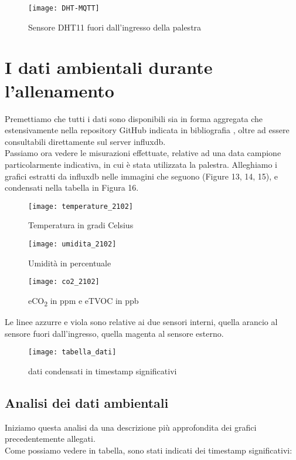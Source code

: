 \documentclass[fleqn,10pt]{SelfArx} %
\begin{document}
\begin{figure}[htb!]\centering
	\texttt{[image: DHT-MQTT]}
	\caption{Sensore DHT11 fuori dall'ingresso della palestra}
	\label{fig:DHT11 MQTT}
\end{figure}

\section{I dati ambientali durante l'allenamento}

Premettiamo che tutti i dati sono disponibili sia in forma aggregata che estensivamente nella repository GitHub indicata 
in bibliografia \cite{GitHub2}, oltre ad essere consultabili direttamente sul server influxdb.\\

Passiamo ora vedere le misurazioni effettuate, relative ad una data campione particolarmente indicativa, in cui è stata utilizzata 
la palestra. Alleghiamo i grafici estratti da influxdb nelle immagini che seguono (Figure 13, 14, 15), e 
condensati nella tabella in Figura 16.\\

\begin{figure}[htb]\centering
	\texttt{[image: temperature\_2102]}
	\caption{Temperatura in gradi Celsius}
	\label{fig:Variazione temperatura}
\end{figure}
\begin{figure}[htb]\centering
	\texttt{[image: umidita\_2102]}
	\caption{Umidità in percentuale}
	\label{fig:Variazione umidità}
\end{figure}
\begin{figure}[htb]\centering
	\texttt{[image: co2\_2102]}
	\caption{eCO\textsubscript{2} in ppm e eTVOC in ppb}
	\label{fig:Variazione CO2}
\end{figure}

Le linee azzurre e viola sono relative ai due sensori interni, quella arancio al sensore fuori dall'ingresso, 
quella magenta al sensore esterno.

\begin{figure}[htb]\centering
	\texttt{[image: tabella\_dati]}
	\captionsetup{width=\linewidth}
	\caption{dati condensati in timestamp significativi}
	\label{fig:tabella dati}
\end{figure}

\subsection{Analisi dei dati ambientali}
Iniziamo questa analisi da una descrizione più approfondita dei grafici precedentemente allegati.\\
Come possiamo vedere in tabella, sono stati indicati dei timestamp significativi: 
\end{document}

